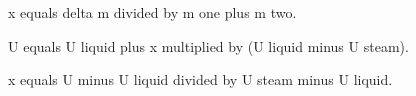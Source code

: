x equals delta m divided by m one plus m two.  

U equals U liquid plus x multiplied by (U liquid minus U steam).  

x equals U minus U liquid divided by U steam minus U liquid.